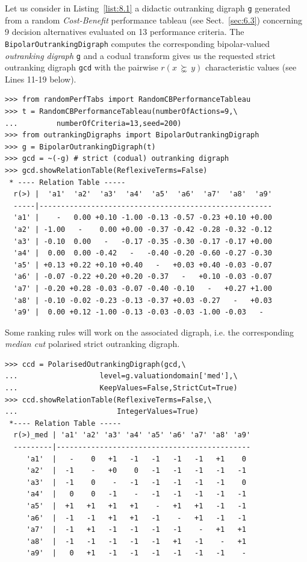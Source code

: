 Let us consider in Listing~\vref{list:8.1} a didactic outranking digraph \texttt{g} generated from a random \emph{Cost-Benefit} performance tableau (see Sect.~\ref{sec:6.3}) concerning 9 decision alternatives evaluated on 13 performance criteria. The \texttt{BipolarOutrankingDigraph} computes the corresponding bipolar-valued \emph{outranking digraph} \texttt{g} and a codual transform gives us the requested strict outranking digraph \texttt{gcd} with the pairwise $r(x\, \succnsim \, y)$ characteristic values (see Lines 11-19 below).
\begin{lstlisting}[caption={Random bipolar-valued strict outranking relation characteristics},label=list:8.1]
>>> from randomPerfTabs import RandomCBPerformanceTableau   
>>> t = RandomCBPerformanceTableau(numberOfActions=9,\
...         numberOfCriteria=13,seed=200)
>>> from outrankingDigraphs import BipolarOutrankingDigraph
>>> g = BipolarOutrankingDigraph(t)
>>> gcd = ~(-g) # strict (codual) outranking digraph
>>> gcd.showRelationTable(ReflexiveTerms=False)
 * ---- Relation Table -----
  r(>) |  'a1'  'a2'  'a3'  'a4'  'a5'  'a6'  'a7'  'a8'  'a9'   
  -----|------------------------------------------------------
  'a1' |    -   0.00 +0.10 -1.00 -0.13 -0.57 -0.23 +0.10 +0.00  
  'a2' | -1.00   -    0.00 +0.00 -0.37 -0.42 -0.28 -0.32 -0.12  
  'a3' | -0.10  0.00   -   -0.17 -0.35 -0.30 -0.17 -0.17 +0.00  
  'a4' |  0.00  0.00 -0.42   -   -0.40 -0.20 -0.60 -0.27 -0.30  
  'a5' | +0.13 +0.22 +0.10 +0.40   -   +0.03 +0.40 -0.03 -0.07  
  'a6' | -0.07 -0.22 +0.20 +0.20 -0.37   -   +0.10 -0.03 -0.07  
  'a7' | -0.20 +0.28 -0.03 -0.07 -0.40 -0.10   -   +0.27 +1.00  
  'a8' | -0.10 -0.02 -0.23 -0.13 -0.37 +0.03 -0.27   -   +0.03  
  'a9' |  0.00 +0.12 -1.00 -0.13 -0.03 -0.03 -1.00 -0.03   -   
\end{lstlisting}
  
Some ranking rules will work on the associated \Condorcet digraph, i.e. the corresponding \emph{median cut} polarised strict outranking digraph.
 \begin{lstlisting}[caption={Median cut polarised strict outranking relation characteristics},label=list:8.2]
>>> ccd = PolarisedOutrankingDigraph(gcd,\
...                   level=g.valuationdomain['med'],\
...                   KeepValues=False,StrictCut=True)
>>> ccd.showRelationTable(ReflexiveTerms=False,\
...                       IntegerValues=True)
 *---- Relation Table -----
  r(>)_med | 'a1' 'a2' 'a3' 'a4' 'a5' 'a6' 'a7' 'a8' 'a9'   
  ---------|---------------------------------------------
     'a1'  |   -    0   +1   -1   -1   -1   -1   +1    0  
     'a2'  |  -1    -   +0    0   -1   -1   -1   -1   -1  
     'a3'  |  -1    0    -   -1   -1   -1   -1   -1    0  
     'a4'  |   0    0   -1    -   -1   -1   -1   -1   -1  
     'a5'  |  +1   +1   +1   +1    -   +1   +1   -1   -1  
     'a6'  |  -1   -1   +1   +1   -1    -   +1   -1   -1  
     'a7'  |  -1   +1   -1   -1   -1   -1    -   +1   +1  
     'a8'  |  -1   -1   -1   -1   -1   +1   -1    -   +1  
     'a9'  |   0   +1   -1   -1   -1   -1   -1   -1    -   
\end{lstlisting}

